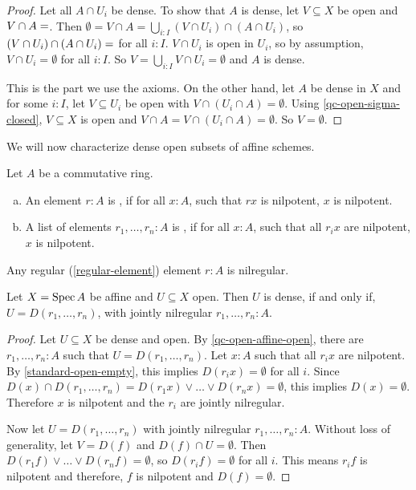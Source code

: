 \begin{proof}
  Let all $A\cap U_i$ be dense.
  To show that $A$ is dense, let $V\subseteq X$ be open and $V\cap A=\empty$.
  Then $\emptyset=V\cap A=\bigcup_{i:I}(V\cap U_i)\cap (A\cap U_i)$, so $(V\cap U_i)\cap (A\cap U_i)=\empty$ for all $i:I$.
  $V\cap U_i$ is open in $U_i$, so by assumption, $V\cap U_i=\emptyset$ for all $i:I$.
  So $V=\bigcup_{i:I}V\cap U_i=\emptyset$ and $A$ is dense.

  This is the part we use the axioms.
  On the other hand, let $A$ be dense in $X$ and for some $i:I$,
  let $V\subseteq U_i$ be open with $V\cap (U_i\cap A)=\emptyset$.
  Using \cref{qc-open-sigma-closed}, $V\subseteq X$ is open and $V\cap A=V\cap (U_i\cap A)=\emptyset$.
  So $V=\emptyset$.
\end{proof}

We will now characterize dense open subsets of affine schemes.

\begin{definition}
  Let $A$ be a commutative ring.
  \begin{enumerate}[(a)]
  \item An element $r:A$ is , if for all $x:A$, such that $rx$ is nilpotent, $x$ is nilpotent.
  \item A list of elements $r_1,\dots,r_n:A$ is , if for all $x:A$,
    such that all $r_ix$ are nilpotent, $x$ is nilpotent.
  \end{enumerate}
\end{definition}

\begin{proposition}
  Any regular (\cref{regular-element}) element $r:A$ is nilregular.
\end{proposition}

\begin{lemma}%
  \label{affine-open-dense-nilregular}
  Let $X=\operatorname{Spec} A$ be affine and $U\subseteq X$ open.
  Then $U$ is dense, if and only if,
  $U=D(r_1,\dots,r_n)$, with jointly nilregular $r_1,\dots,r_n:A$.
\end{lemma}

\begin{proof}
  Let $U\subseteq X$ be dense and open.
  By \cref{qc-open-affine-open}, there are $r_1,\dots,r_n:A$ such that $U=D(r_1,\dots,r_n)$.
  Let $x:A$ such that all $r_ix$ are nilpotent.
  By \cref{standard-open-empty}, this implies $D(r_ix)=\emptyset$ for all $i$.
  Since $D(x)\cap D(r_1,\dots,r_n)=D(r_1x)\vee\dots\vee D(r_nx)=\emptyset$,
  this implies $D(x)=\emptyset$.
  Therefore $x$ is nilpotent and the $r_i$ are jointly nilregular.

  Now let $U=D(r_1,\dots,r_n)$ with jointly nilregular $r_1,\dots,r_n:A$.
  Without loss of generality, let $V=D(f)$ and $D(f)\cap U=\emptyset$.
  Then $D(r_1f)\vee \dots \vee D(r_nf)=\emptyset$, so $D(r_if)=\emptyset$ for all $i$.
  This means $r_if$ is nilpotent and therefore, $f$ is nilpotent and $D(f)=\emptyset$.
\end{proof}

